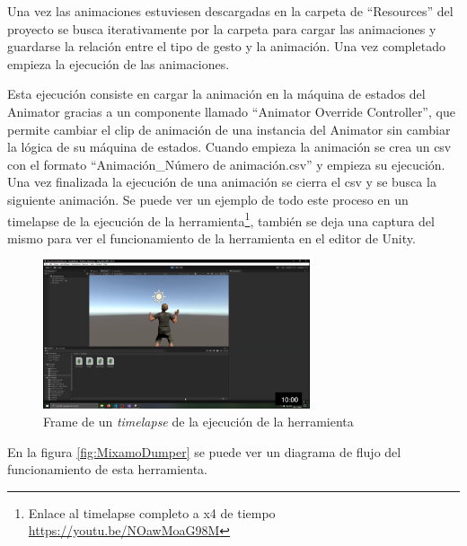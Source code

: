 Una vez las animaciones estuviesen descargadas en la carpeta de ``Resources'' del proyecto se busca iterativamente por la carpeta para cargar las animaciones y guardarse la relación entre el tipo de gesto y la animación.
Una vez completado empieza la ejecución de las animaciones.

Esta ejecución consiste en cargar la animación en la máquina de estados del \gls{Animator} gracias a un componente llamado ``Animator Override Controller'', que permite cambiar el clip de animación de una instancia del \gls{Animator} sin cambiar la lógica de su máquina de estados.
Cuando empieza la animación se crea un \gls{csv} con el formato ``Animación\_Número de animación.csv'' y empieza su ejecución.
Una vez finalizada la ejecución de una animación se cierra el \gls{csv} y se busca la siguiente animación. Se puede ver un ejemplo de todo este proceso en un timelapse de la ejecución de la herramienta\footnote{Enlace al timelapse completo a x4 de tiempo \url{https://youtu.be/NOawMoaG98M}}, también se deja una captura del mismo para ver el funcionamiento de la herramienta en el editor de Unity.

\begin{figure}[H]
    \centering
    \includegraphics[width=0.7\textwidth]{Imagenes/Bitmap/remy_bailon.png}
    \caption{Frame de un \textit{timelapse} de la ejecución de la herramienta}
    \label{fig:frame-timelapse}
\end{figure}

En la figura \ref{fig:MixamoDumper} se puede ver un diagrama de flujo del funcionamiento de esta herramienta.

